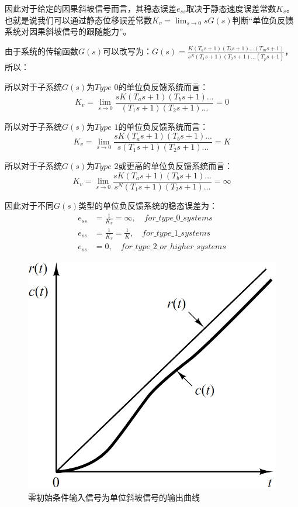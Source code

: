 \documentclass{article}
\numberwithin{equation}{section}
\numberwithin{figure}{section}
\begin{document}
因此对于给定的因果斜坡信号而言，其稳态误差$e_{ss}$取决于静态速度误差常数$K_v$。也就是说我们可以通过静态位移误差常数$K_v=\lim_{s\rightarrow 0}sG(s)$判断“单位负反馈系统对因果斜坡信号的跟随能力”。

由于系统的传输函数$G(s)$可以改写为：$G(s)=\frac{K(T_as+1)(T_bs+1)...(T_ms+1)}{s^N(T_1s+1)(T_2s+1)...(T_ps+1)}$，所以：

所以对于子系统$G(s)$为$Type$ $0$的单位负反馈系统而言：
\begin{equation}
    K_v=\lim_{s\rightarrow 0}\frac{sK(T_as+1)(T_bs+1)...}{(T_1s+1)(T_2s+1)...}=0
\end{equation}

所以对于子系统$G(s)$为$Type$ $1$的单位负反馈系统而言：
\begin{equation}
    K_v=\lim_{s\rightarrow 0}\frac{sK(T_as+1)(T_bs+1)...}{s(T_1s+1)(T_2s+1)...}=K
\end{equation}

所以对于子系统$G(s)$为$Type$ $2$或更高的单位负反馈系统而言：
\begin{equation}
    K_v=\lim_{s\rightarrow 0}\frac{sK(T_as+1)(T_bs+1)...}{s^N(T_1s+1)(T_2s+1)...}=\infty
\end{equation}

因此对于不同$G(s)$类型的单位负反馈系统的稳态误差为：
\begin{equation}
    \begin{split}
        e_{ss}&=\frac{1}{K_v}=\infty,\quad for\_type\_0\_systems\\
        e_{ss}&=\frac{1}{K_v}=\frac{1}{K},\quad for\_type\_1\_systems\\
        e_{ss}&=0,\quad for\_type\_2\_or\_higher\_systems
    \end{split}
\end{equation}

\begin{figure}
    \centering
    \includegraphics[width=.4\textwidth]{Chapter5/unitramptype1.png} %
    \caption{零初始条件输入信号为单位斜坡信号的输出曲线} %
    \label{unitramptype1} %
\end{figure}
\end{document}
